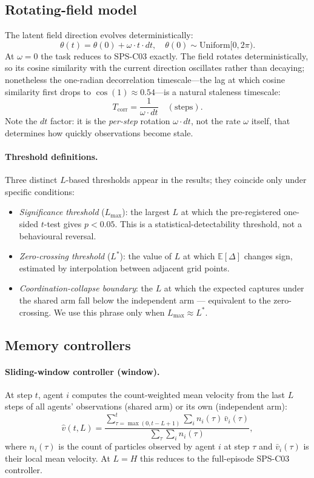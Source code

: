 \documentclass[sigconf,anonymous]{aamas}
\newcommand{\Lmax}{L_{\max}}
\newcommand{\Tcorr}{T_{\mathrm{corr}}}
\newcommand{\omdt}{\omega\!\cdot\!dt}
\begin{document}
\subsection{Rotating-field model}

The latent field direction evolves deterministically:
\[
  \theta(t) = \theta(0) + \omega \cdot t \cdot dt,
  \quad \theta(0) \sim \mathrm{Uniform}[0, 2\pi).
\]
At $\omega{=}0$ the task reduces to SPS-C03 exactly.
The field rotates deterministically, so its cosine similarity
with the current direction oscillates rather than decaying; nonetheless
the one-radian decorrelation timescale—the lag at which cosine similarity
first drops to $\cos(1) \approx 0.54$—is a natural staleness timescale:
\[
  \Tcorr = \frac{1}{\omdt} \quad (\text{steps}).
\]
Note the $dt$ factor: it is the \emph{per-step} rotation
$\omdt$, not the rate $\omega$ itself, that determines how
quickly observations become stale.

\paragraph{Threshold definitions.}
\label{sec:threshold-defs}
Three distinct $L$-based thresholds appear in the results;
they coincide only under specific conditions:
\begin{itemize}[noitemsep,topsep=2pt]
  \item \emph{Significance threshold} ($\Lmax$): the largest $L$
        at which the pre-registered one-sided $t$-test gives $p{<}0.05$.
        This is a statistical-detectability threshold,
        not a behavioural reversal.
  \item \emph{Zero-crossing threshold} ($L^*$): the value of $L$ at
        which $\mathbb{E}[\Delta]$ changes sign, estimated by
        interpolation between adjacent grid points.
  \item \emph{Coordination-collapse boundary}: the $L$ at which the
        expected captures under the shared arm fall below the
        independent arm — equivalent to the zero-crossing.  We use
        this phrase only when $\Lmax \approx L^*$.
\end{itemize}

\subsection{Memory controllers}

\paragraph{Sliding-window controller (window).}
At step $t$, agent $i$ computes the count-weighted mean velocity
from the last $L$ steps of all agents' observations (shared arm)
or its own (independent arm):
\begin{equation}
  \hat{v}(t, L) =
  \frac{\sum_{\tau=\max(0,t-L+1)}^{t}
        \sum_i n_i(\tau)\,\bar{v}_i(\tau)}
       {\sum_{\tau}\sum_i n_i(\tau)},
  \label{eq:window}
\end{equation}
where $n_i(\tau)$ is the count of particles observed by agent $i$
at step $\tau$ and $\bar{v}_i(\tau)$ is their local mean velocity.
At $L{=}H$ this reduces to the full-episode SPS-C03 controller.
\end{document}
